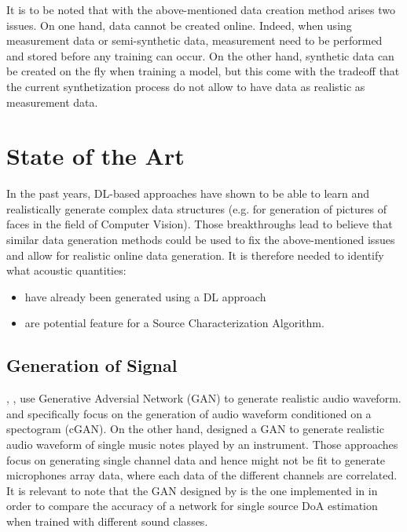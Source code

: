 \documentclass[11pt,a4paper,twoside]{report}
\begin{document}
It is to be noted that with the above-mentioned data creation method arises two issues. On one hand, data cannot be created online. Indeed, when using measurement data or semi-synthetic data, measurement need to be performed and stored before any training can occur. On the other hand, synthetic data can be created on the fly when training a model, but this come with the tradeoff that the current synthetization process do not allow to have data as realistic as measurement data.

\section{State of the Art}

In the past years, DL-based approaches have shown to be able to learn and realistically generate complex data structures (e.g. \cite{karras2017progressive} for generation of pictures of faces in the field of Computer Vision). Those breakthroughs lead to believe that similar data generation methods could be used to fix the above-mentioned issues and allow for realistic online data generation. It is therefore needed to identify what acoustic quantities:
\begin{itemize}
    \item have already been generated using a DL approach
    \item are potential feature for a Source Characterization Algorithm.
\end{itemize}

\subsection{Generation of Signal}

\cite{neekhara2019expediting}, \cite{NEURIPS2019_6804c9bc}, \cite{engel2019gansynth} use Generative Adversial Network (GAN) to generate realistic audio waveform. \cite{neekhara2019expediting} and \cite{NEURIPS2019_6804c9bc} specifically focus on the generation of audio waveform conditioned on a spectogram (cGAN). On the other hand, \cite{engel2019gansynth} designed a GAN to generate realistic audio waveform of single music notes played by an instrument. Those approaches focus on generating single channel data and hence might not be fit to generate microphones array data, where each data of the different channels are correlated. It is relevant to note that the GAN designed by \cite{neekhara2019expediting} is the one implemented in \cite{vargas2021improved} in order to compare the accuracy of a network for single source DoA estimation when trained with different sound classes.
\end{document}
